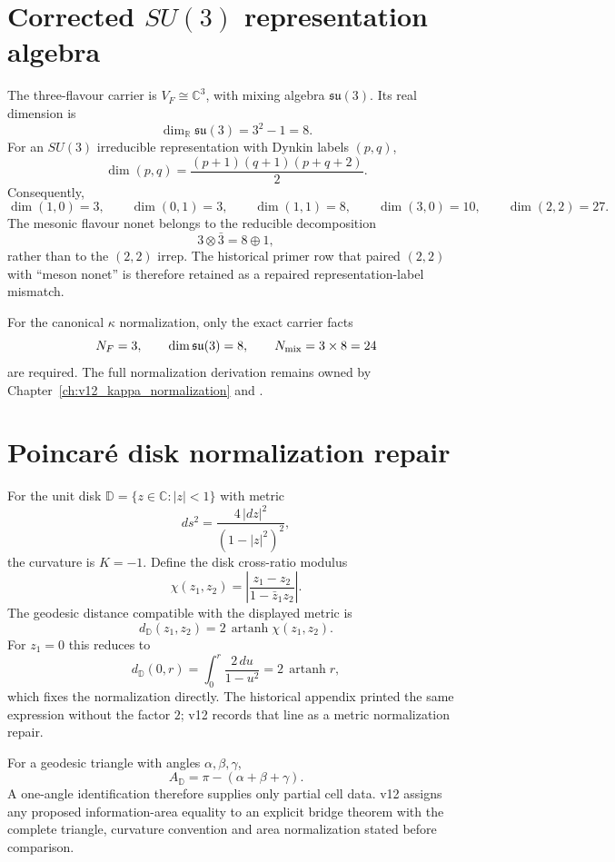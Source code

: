 \section{Corrected \(SU(3)\) representation algebra}

The three-flavour carrier is \(V_F\cong\mathbb C^3\), with mixing algebra
\(\mathfrak{su}(3)\).  Its real dimension is
\[
\dim_{\mathbb R}\mathfrak{su}(3)=3^2-1=8.
\]
For an \(SU(3)\) irreducible representation with Dynkin labels \((p,q)\),
\[
\boxed{
\dim(p,q)=\frac{(p+1)(q+1)(p+q+2)}{2}.
}
\]
Consequently,
\[
\dim(1,0)=3,\qquad
\dim(0,1)=3,\qquad
\dim(1,1)=8,\qquad
\dim(3,0)=10,\qquad
\dim(2,2)=27.
\]
The mesonic flavour nonet belongs to the reducible decomposition
\[
\boxed{
3\otimes\bar3=8\oplus1,
}
\]
rather than to the \((2,2)\) irrep.  The historical primer row that paired
\((2,2)\) with ``meson nonet'' is therefore retained as a repaired
representation-label mismatch.

For the canonical \(\kappa\) normalization, only the exact carrier facts
\[
N_F=3,\qquad \dim\mathfrak{su}(3)=8,\qquad N_{\rm mix}=3\times8=24
\]
are required.  The full normalization derivation remains owned by
Chapter~\ref{ch:v12_kappa_normalization} and
.

\section{Poincar\'e disk normalization repair}

For the unit disk \(\mathbb D=\{z\in\mathbb C:|z|<1\}\) with metric
\[
ds^2=\frac{4\,|dz|^2}{(1-|z|^2)^2},
\]
the curvature is \(K=-1\).  Define the disk cross-ratio modulus
\[
\chi(z_1,z_2)=
\left|
\frac{z_1-z_2}{1-\bar z_1z_2}
\right|.
\]
The geodesic distance compatible with the displayed metric is
\[
\boxed{
d_{\mathbb D}(z_1,z_2)
=2\,\operatorname{artanh}\chi(z_1,z_2).
}
\]
For \(z_1=0\) this reduces to
\[
d_{\mathbb D}(0,r)=\int_0^r\frac{2\,du}{1-u^2}
=2\,\operatorname{artanh}r,
\]
which fixes the normalization directly.  The historical appendix printed the
same expression without the factor \(2\); v12 records that line as a metric
normalization repair.

For a geodesic triangle with angles \(\alpha,\beta,\gamma\),
\[
A_{\mathbb D}=\pi-(\alpha+\beta+\gamma).
\]
A one-angle identification therefore supplies only partial cell data.  v12
assigns any proposed information-area equality to an explicit bridge theorem
with the complete triangle, curvature convention and area normalization stated
before comparison.

